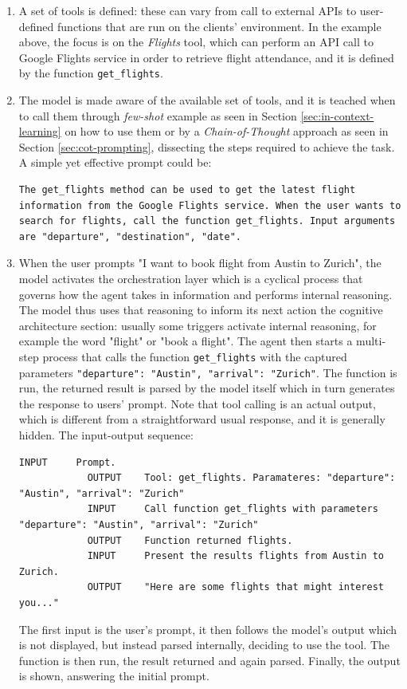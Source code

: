 \begin{enumerate}
    \item A set of tools is defined: these can vary from call to external APIs to user-defined functions that are run on the clients' environment. In the example above, the focus is on the \textit{Flights} tool, which can perform an API call to Google Flights service in order to retrieve flight attendance, and it is defined by the function \verb|get_flights|.
    \item The model is made aware of the available set of tools, and it is teached when to call them through \textit{few-shot} example as seen in Section \ref{sec:in-context-learning} on how to use them or by a \textit{Chain-of-Thought} approach as seen in Section \ref{sec:cot-prompting}, dissecting the steps required to achieve the task. A simple yet effective prompt could be:
    
    \begin{Verbatim}[breaklines=true]
        The get_flights method can be used to get the latest flight information from the Google Flights service. When the user wants to search for flights, call the function get_flights. Input arguments are "departure", "destination", "date".
    \end{Verbatim}

    \item When the user prompts "I want to book flight from Austin to Zurich", the model activates the orchestration layer which is a cyclical process that governs how the agent takes in information and performs internal reasoning. The model thus uses that reasoning to inform its next action the cognitive architecture section: usually some triggers activate internal reasoning, for example the word "flight" or "book a flight". The agent then starts a multi-step process that calls the function \verb|get_flights| with the captured parameters \verb|"departure": "Austin", "arrival": "Zurich"|. The function is run, the returned result is parsed by the model itself which in turn generates the response to users' prompt.
    Note that tool calling is an actual output, which is different from a straightforward usual response, and it is generally hidden. The input-output sequence:
        \begin{Verbatim}[breaklines=true]
            INPUT     Prompt.
            OUTPUT    Tool: get_flights. Paramateres: "departure": "Austin", "arrival": "Zurich"
            INPUT     Call function get_flights with parameters "departure": "Austin", "arrival": "Zurich"
            OUTPUT    Function returned flights.
            INPUT     Present the results flights from Austin to Zurich.
            OUTPUT    "Here are some flights that might interest you..."
        \end{Verbatim}
    The first input is the user's prompt, it then follows the model's output which is not displayed, but instead parsed internally, deciding to use the tool. The function is then run, the result returned and again parsed. Finally, the output is shown, answering the initial prompt.
\end{enumerate}

